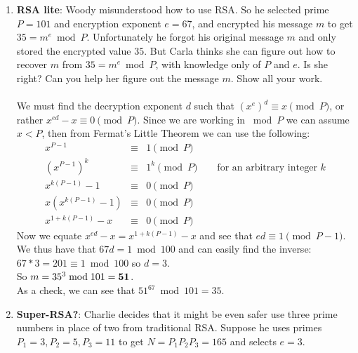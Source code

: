 \documentclass[11pt,fleqn]{article}
\begin{document}
\begin{enumerate}
\newpage
\item \textbf{RSA lite}: Woody misunderstood how to use RSA. 
So he selected prime $P = 101$ and encryption 
exponent $e = 67$, and encrypted his message $m$ to get $35 = m^e \bmod P$.
Unfortunately he forgot his original message $m$
and only stored the encrypted value $35$. But Carla thinks she 
can figure out how to recover $m$ from $35 = m^e \bmod P$, with 
knowledge only of $P$ and $e$. Is she right? 
Can you help her figure out the message $m$. Show all your work. \\ \\
We must find the decryption exponent $d$ such that $(x^e)^d \equiv x \pmod P$, or rather $x^{ed} - x \equiv 0 \pmod P$.
Since we are working in $\bmod P$ we can assume $x<P$, then from Fermat's Little Theorem we can use the following: \\
\begin{eqnarray*}
x^{P-1} & \equiv & 1 \pmod P \\
(x^{P-1})^k & \equiv & 1^k \pmod P \qquad \text{for an arbitrary integer } k \\
x^{k(P-1)}-1 & \equiv & 0 \pmod P \\
x(x^{k(P-1)}-1) & \equiv & 0 \pmod P \\
x^{1+k(P-1)}-x & \equiv & 0 \pmod P
\end{eqnarray*} 
Now we equate $x^{ed} - x = x^{1+k(P-1)} - x$ and see that $ed \equiv 1 \pmod{P-1}$. \\
We thus have that $67d = 1 \bmod 100$ and can easily find the inverse: $67*3 = 201 \equiv 1 \bmod 100$ so $d=3$. \\
So $m = 35^3 \bmod 101 = {\bf 51}$. \\
As a check, we can see that $51^{67} \bmod 101 = 35$.

\newpage
\item \textbf{Super-RSA?}: Charlie decides that it might be even safer use three 
prime numbers in place of two from traditional RSA. Suppose he uses primes 
$P_1 = 3, P_2 = 5, P_3 = 11$ to get $N = P_1 P_2 P_3 = 165$ and selects $e = 3$. 


\end{enumerate}
\end{document}
